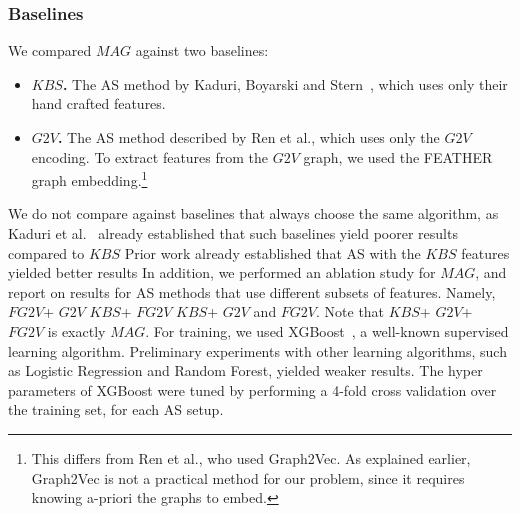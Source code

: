 \documentclass[letterpaper]{article} %
\newcommand{\shortcite}[1]{\cite{#1}}
\newcommand{\gtv}[1]{\ensuremath{\textit{G2V}}\xspace}
\newcommand{\fgtv}[1]{\ensuremath{\textit{FG2V}}\xspace}
\newcommand{\kaduri}[1]{\ensuremath{\textit{KBS}}\xspace}
\newcommand{\mapfgas}[1]{\ensuremath{\textit{MAG}}\xspace}
\begin{document}
\subsubsection{Baselines}
We compared \mapfgas\ against two baselines: 
\begin{itemize}
    \item \textbf{\kaduri\ .} The AS method by Kaduri, Boyarski and Stern~\cite{kaduri2020algorithm}, which uses only their hand crafted features. 
    \item \textbf{\gtv\ .} The AS method described by Ren et al.\cite{ren2021mapfast}, which uses only the \gtv\ encoding. To extract features from the \gtv\ graph, we used the FEATHER graph embedding.\footnote{This differs from Ren et al., who used Graph2Vec. As explained earlier, Graph2Vec is not a practical method for our problem, since it requires knowing a-priori the graphs to embed.}
\end{itemize}
We do not compare against baselines that always choose the same algorithm, as Kaduri et al.~\shortcite{stern2019multi} already established that such baselines yield poorer results compared to \kaduri. 
Prior work already established that AS with the \kaduri\ features yielded better results 
In addition, we performed an ablation study for \mapfgas\ , and report on results for AS methods that use different subsets of features. Namely, \fgtv\ + \gtv\, 
\kaduri\ + \fgtv\, 
\kaduri\ + \gtv\, 
and \fgtv\ .
Note that \kaduri\ + \gtv\ + \fgtv\ is exactly \mapfgas\ .
For training, we used XGBoost~\cite{chen2016xgboost}, a well-known supervised learning algorithm. 
Preliminary experiments with other learning algorithms, such as Logistic Regression and Random Forest, yielded weaker results. %
The hyper parameters of XGBoost were tuned by performing a  4-fold cross validation over the training set, for each AS setup. 
\end{document}
